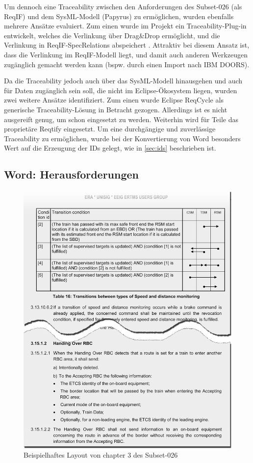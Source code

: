 \documentclass[twoside]{article}
\begin{document}
\begin{multicols}{2}
Um dennoch eine Traceability zwischen den Anforderungen des Subset-026 (als ReqIF) und dem SysML-Modell (Papyrus) zu ermöglichen, wurden ebenfalls mehrere Ansätze evaluiert.  Zum einen wurde im Projekt ein Traceability-Plug-in entwickelt, welches die Verlinkung über Drag\&Drop ermöglicht, und die Verlinkung in ReqIF-SpecRelations abspeichert \cite{rmf-traces}.  Attraktiv bei diesem Ansatz ist, dass die Verlinkung im ReqIF-Modell liegt, und damit auch anderen Werkzeugen zugänglich gemacht werden kann (bspw. durch einen Import nach IBM DOORS).

Da die Traceability jedoch auch über das SysML-Modell hinausgehen und auch für Daten zugänglich sein soll, die nicht im Eclipse-Ökosystem liegen, wurden zwei weitere Ansätze identifiziert.  Zum einen wurde Eclipse ReqCycle \cite{reqcycle} als generische Traceability-Lösung in Betracht gezogen.  Allerdings ist es nicht ausgereift genug, um schon eingesetzt zu werden.  Weiterhin wird für Teile das proprietäre Reqtify eingesetzt.  Um eine durchgängige und zuverlässige Traceability zu ermöglichen, wurde bei der Konvertierung von Word besonders Wert auf die Erzeugung der IDs gelegt, wie in \ref{sec:ids} beschrieben ist.

\subsection{Word: Herausforderungen}


\begin{figure}
\centering
\includegraphics[width=0.8\linewidth]{img/word_screenshot.png}
\caption{Beispielhaftes Layout von chapter 3 des Subset-026}
\label{fig:word_screenshot}
\end{figure}


\end{multicols}
\end{document}
